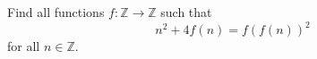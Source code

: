 Find all functions 
$f : \mathbb{Z} \to \mathbb{Z}$
 such that
\[ n^2+4f(n)=f(f(n))^2 \]
for all 
$n\in \mathbb{Z}$.
